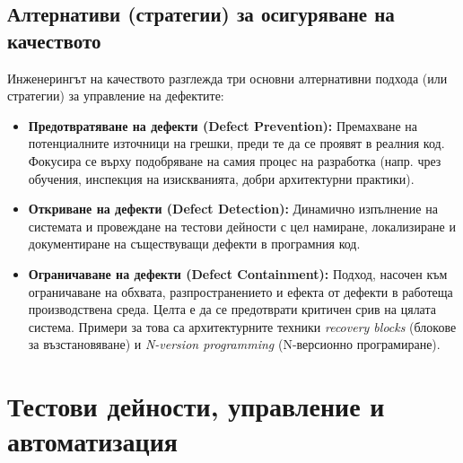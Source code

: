 \documentclass{scrartcl}
\begin{document}
\begin{FlushLeft}
\subsection{Алтернативи (стратегии) за осигуряване на качеството}
Инженерингът на качеството разглежда три основни алтернативни подхода (или стратегии) за управление на дефектите:
\begin{itemize}
    \item \textbf{Предотвратяване на дефекти (Defect Prevention):} Премахване на потенциалните източници на грешки, преди те да се проявят в реалния код. Фокусира се върху подобряване на самия процес на разработка (напр. чрез обучения, инспекция на изискванията, добри архитектурни практики).
    \item \textbf{Откриване на дефекти (Defect Detection):} Динамично изпълнение на системата и провеждане на тестови дейности с цел намиране, локализиране и документиране на съществуващи дефекти в програмния код.
    \item \textbf{Ограничаване на дефекти (Defect Containment):} Подход, насочен към ограничаване на обхвата, разпространението и ефекта от дефекти в работеща производствена среда. Целта е да се предотврати критичен срив на цялата система. Примери за това са архитектурните техники \textit{recovery blocks} (блокове за възстановяване) и \textit{N-version programming} (N-версионно програмиране).
\end{itemize}

\section{Тестови дейности, управление и автоматизация}


\end{FlushLeft}
\end{document}

